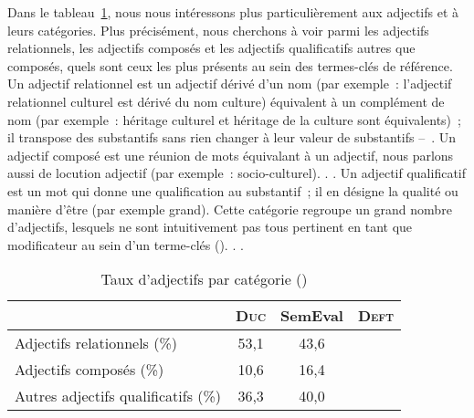       Dans le tableau~\ref{tab:candidate_selection-adjective_categories}, nous
      nous intéressons plus particulièrement aux adjectifs et à leurs
      catégories. Plus précisément, nous cherchons à voir parmi les adjectifs
      relationnels, les adjectifs composés et les adjectifs qualificatifs autres
      que composés, quels sont ceux les plus présents au sein des termes-clés de
      référence. Un adjectif relationnel est un adjectif dérivé d'un nom (par
      exemple~: l'adjectif relationnel \og{}culturel\fg{} est dérivé du nom
      \og{}culture\fg{}) équivalent à un complément de nom (par exemple~:
      \og{}héritage culturel\fg{} et \og{}héritage de la culture\fg{} sont
      équivalents)~; il \og{}transpose des substantifs sans rien changer à leur
      valeur de substantifs
      --~\cite{bally1944linguistiquegeneraleetlinguistiquefrancaise}\fg{}.
       Un adjectif composé est une
      réunion de mots équivalant à un adjectif, nous parlons aussi de locution
      adjectif (par exemple~: \og{}socio-culturel\fg{}). .
      . Un adjectif qualificatif est un
      mot qui donne une qualification au substantif~; il en désigne la qualité
      ou manière d'être (par exemple \og{}grand\fg{}). Cette catégorie regroupe
      un grand nombre d'adjectifs, lesquels ne sont intuitivement pas tous
      pertinent en tant que modificateur au sein d'un terme-clés
      (). . .
      \begin{table}[!ht]
        \centering
          \begin{tabular}{l|ccc}
            \toprule
            & \textbf{\textsc{Duc}} & \textbf{SemEval} & \textbf{\textsc{Deft}} \\
            \hline
            Adjectifs relationnels \hfill(\%) & 53,1 & 43,6\\
            Adjectifs composés \hfill(\%) & 10,6 & 16,4\\
            Autres adjectifs qualificatifs \hfill(\%) & 36,3 & 40,0\\
            \bottomrule
        \end{tabular}
        \caption{Taux d'adjectifs par catégorie ()}
        \label{tab:candidate_selection-adjective_categories}
      \end{table}

